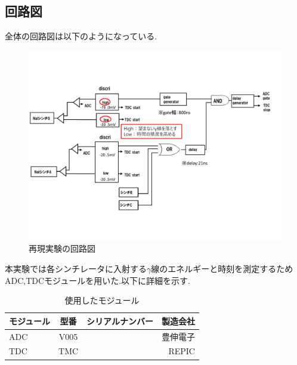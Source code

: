 \subsection{回路図}
全体の回路図は以下のようになっている.
\begin{figure}[H]
	\begin{center}
		\includegraphics[width=15cm]{fig/isb/circuit.pdf}
		\caption{再現実験の回路図}
		\label{fig:circuit2015}
	\end{center}
\end{figure}

本実験では各シンチレータに入射する$\gamma$線のエネルギーと時刻を測定するためADC,TDCモジュールを用いた.以下に詳細を示す.
\begin{table}[htbp]
	\begin{center}
		\caption{使用したモジュール}
		\begin{tabular}{|l|c|r|r|} \hline
			モジュール & 型番 & シリアルナンバー & 製造会社 \\ \hline \hline
			ADC & V005 & & 豊伸電子 \\ \hline
			TDC & TMC & & REPIC \\ \hline
		\end{tabular}
		\label{module}
	\end{center}
\end{table}

